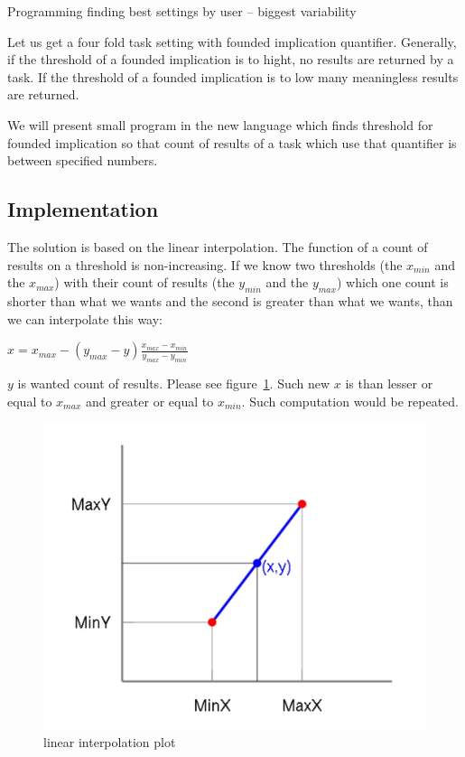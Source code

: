\documentclass[a4paper,12pt]{book}
\begin{document}
Programming finding best settings by user -- biggest variability

Let us get a four fold task setting with founded implication quantifier. Generally, if the threshold of a founded implication is to hight, no results are returned by a task. If the threshold of a founded implication is to low many meaningless results are returned.

We will present small program in the new language which finds threshold for founded implication so that count of results of a task which use that quantifier is between specified numbers.

\subsection{Implementation}
The solution is based on the linear interpolation. The function of a count of results on a threshold is non-increasing. If we know two thresholds (the $x_{min}$ and the $x_{max}$) with their count of results (the $y_{min}$ and the $y_{max}$) which one count is shorter than what we wants and the second is greater than what we wants, than we can interpolate this way: 

\begin{math}
x = x_{max} - (y_{max} - y)\frac{x_{max} - x_{min}}{y_{max} - y_{min}}
\end{math}

$y$ is wanted count of results. Please see figure~\ref{fig:linearInterpolationPlot}. Such new $x$ is than lesser or equal to $x_{max}$ and greater or equal to $x_{min}$. Such computation would be repeated.

\begin{figure}
	\includegraphics[width=1\textwidth]{linearInterpolationPlot}
	\caption{linear interpolation plot}
	\label{fig:linearInterpolationPlot}
\end{figure}
\end{document}
